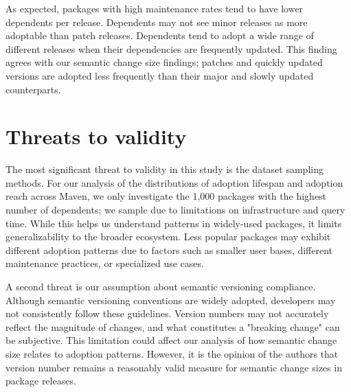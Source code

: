 \documentclass[conference]{IEEEtran}
\begin{document}

As expected, packages with high maintenance rates tend to have lower dependents per release. Dependents may not see minor releases as more adoptable than patch releases. Dependents tend to adopt a wide range of different releases when their dependencies are frequently updated. This finding agrees with our semantic change size findings; patches and quickly updated versions are adopted less frequently than their major and slowly updated counterparts. %

\section{Threats to validity} \label{sec: threats}

The most significant threat to validity in this study is the dataset sampling methods. For our analysis of the distributions of adoption lifespan and adoption reach across Maven, we only investigate the 1,000 packages with the highest number of dependents; we sample due to limitations on infrastructure and query time. While this helps us understand patterns in widely-used packages, it limits generalizability to the broader ecosystem. Less popular packages may exhibit different adoption patterns due to factors such as smaller user bases, different maintenance practices, or specialized use cases.

A second threat is our assumption about semantic versioning compliance. Although semantic versioning conventions are widely adopted, developers may not consistently follow these guidelines. Version numbers may not accurately reflect the magnitude of changes, and what constitutes a "breaking change" can be subjective. This limitation could affect our analysis of how semantic change size relates to adoption patterns. However, it is the opinion of the authors that version number remains a reasonably valid measure for semantic change sizes in package releases. 
\end{document}
